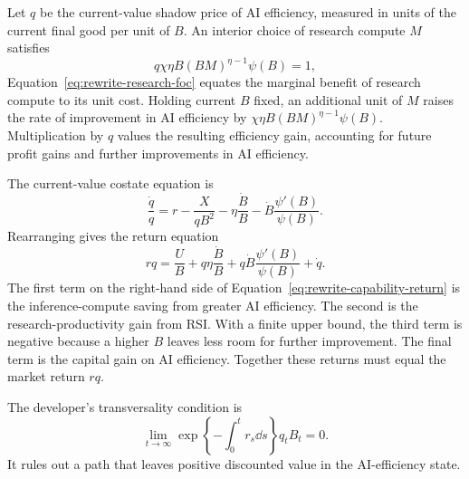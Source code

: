 Let $q$ be the current-value shadow price of AI efficiency, measured in units of
the current final good per unit of $B$. An interior choice of research compute $M$ satisfies
\begin{equation}
 q\chi\eta B(BM)^{\eta-1}\psi(B)=1,
 \label{eq:rewrite-research-foc}
\end{equation}
Equation~\eqref{eq:rewrite-research-foc} equates the marginal benefit of research compute to its unit cost. Holding current $B$ fixed, an additional unit of $M$ raises the rate of improvement in AI efficiency by \(\chi\eta B(BM)^{\eta-1}\psi(B)\).
Multiplication by $q$ values the resulting efficiency gain, accounting for future profit gains and further improvements in AI efficiency. %

The current-value costate equation is
\begin{equation}
 \frac{\dot q}{q}=r-\frac{X}{qB^2}-\eta\frac{\dot B}{B}
 -\dot B\frac{\psi'(B)}{\psi(B)}.
 \label{eq:rewrite-costate}
\end{equation}
Rearranging gives the return equation
\begin{equation}
 rq=\frac{U}{B}+q\eta\frac{\dot B}{B}
 +q\dot B\frac{\psi'(B)}{\psi(B)}+\dot q.
 \label{eq:rewrite-capability-return}
\end{equation}
The first term on the right-hand side of Equation~\eqref{eq:rewrite-capability-return} is the inference-compute saving from greater AI efficiency. The
second is the research-productivity gain from RSI. With a finite upper bound, the third
term is negative because a higher $B$ leaves less room for further improvement. The final term is the capital gain on AI efficiency. Together these
returns must equal the market return $rq$.

The developer's transversality condition is
\begin{equation}
 \lim_{t\to\infty}
 \exp\left\{-\int_0^t r_s\dd s\right\}q_tB_t=0.
 \label{eq:rewrite-developer-tvc}
\end{equation}
It rules out a path that leaves positive discounted value in the AI-efficiency state.%

